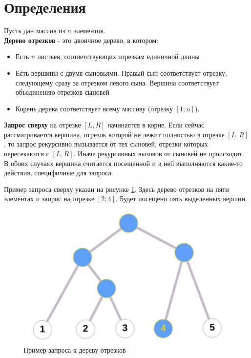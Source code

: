 \section{Определения}

Пусть дан массив из $n$ элементов. \\
\textbf{Дерево отрезков} - это двоичное дерево, в котором:

\begin{itemize}
    \item Есть $n$ листьев, соответствующих отрезкам единичной длины
    \item Есть вершины с двумя сыновьями. Правый сын соответствует отрезку,
    следующему сразу за отрезком левого сына. Вершина соответствует
    объединению отрезков сыновей
    \item Корень дерева соответствует всему массиву (отрезку $[1; n]$).
\end{itemize}

\textbf{Запрос сверху} на отрезке $[L, R]$ начинается в корне.
Если сейчас рассматривается вершина, отрезок которой не лежит полностью в
отрезке $[L, R]$, то запрос рекурсивно вызывается от тех сыновей, отрезки которых
пересекаются с $[L, R]$. Иначе рекурсивных вызовов от сыновей не происходит.
В обоих случаях вершина считается посещенной и в ней выполняются какие-то
действия, специфичные для запроса.

Пример запроса сверху указан на рисунке \ref{fig:segtree_example}. Здесь дерево отрезков на пяти элементах и запрос на отрезке $[2;4]$. Будет посещено пять выделенных вершин.

\begin{figure}[hbt!]
    \centering
    \includegraphics[scale=0.28]{images/segtree_example.png}
    \caption{Пример запроса к дереву отрезков}
    \label{fig:segtree_example}
\end{figure}


